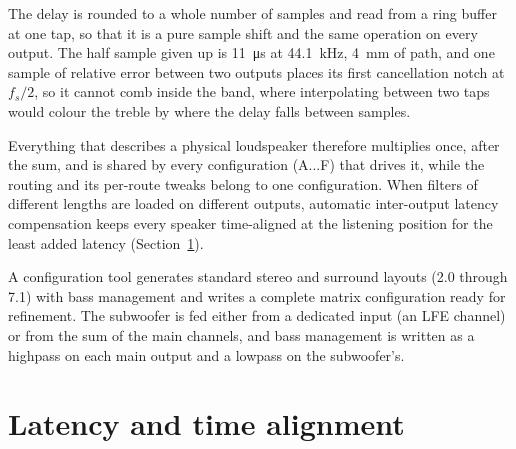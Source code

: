 \documentclass[10pt,a4paper]{article}
\begin{document}
The delay is rounded to a whole number of samples and read from a ring buffer at one tap, so that it is a pure sample shift and the same operation on every output. The half sample given up is \SI{11}{\micro\second} at \SI{44.1}{\kilo\hertz}, \SI{4}{\milli\metre} of path, and one sample of relative error between two outputs places its first cancellation notch at $f_s/2$, so it cannot comb inside the band, where interpolating between two taps would colour the treble by where the delay falls between samples.

Everything that describes a physical loudspeaker therefore multiplies once, after the sum, and is shared by every configuration (A...F) that drives it, while the routing and its per-route tweaks belong to one configuration. When filters of different lengths are loaded on different outputs, automatic inter-output latency compensation keeps every speaker time-aligned at the listening position for the least added latency (Section~\ref{sec:latency}).

A configuration tool generates standard stereo and surround layouts (2.0 through 7.1) with bass management and writes a complete matrix configuration ready for refinement. The subwoofer is fed either from a dedicated input (an LFE channel) or from the sum of the main channels, and bass management is written as a highpass on each main output and a lowpass on the subwoofer's.

\section{Latency and time alignment}\label{sec:latency}
\end{document}
